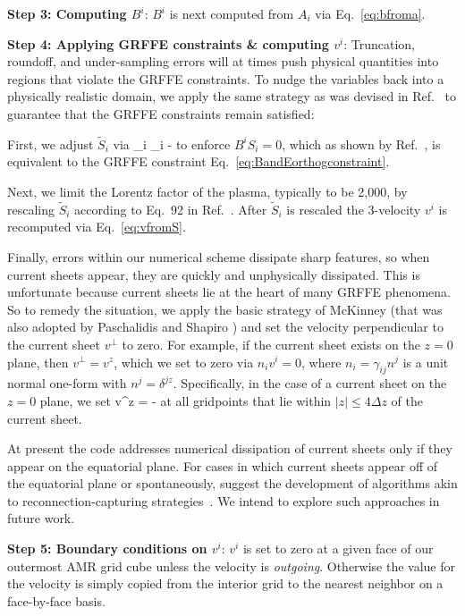 {\bf Step 3: Computing $B^i$}: $B^i$ is next computed from $A_i$ via
Eq.~\ref{eq:bfroma}.

{\bf Step 4: Applying GRFFE constraints \& computing $v^i$}:
Truncation, roundoff, and under-sampling errors will at times push
physical quantities into regions that violate the GRFFE
constraints. To nudge the variables back into a physically realistic
domain, we apply the same strategy as was devised in
Ref.~\cite{Paschalidis:2013} to guarantee that the GRFFE constraints
remain satisfied:

First, we adjust $\tilde{S}_i$ via
\beq
{}_i \to {}_i - 
\eeq
to enforce $B^i S_i=0$, which as shown by Ref.~\cite{Paschalidis:2013}, is
equivalent to the GRFFE constraint Eq.~\ref{eq:BandEorthogconstraint}.

Next, we limit the Lorentz factor of the plasma, typically to be
2,000, by rescaling $\tilde{S}_i$ according to Eq.~92 in
Ref.~\cite{Paschalidis:2013}. After $\tilde{S}_i$ is rescaled the
3-velocity $v^i$ is recomputed via Eq.~\ref{eq:vfromS}.

Finally, errors within our numerical scheme dissipate
sharp features, so when current sheets appear, they are quickly
and unphysically dissipated. This is unfortunate because current
sheets lie at the heart of many GRFFE phenomena. So to remedy the
situation, we apply the basic strategy of McKinney
\cite{McKinney:2006} (that was also adopted by Paschalidis and Shapiro 
\cite{Paschalidis:2013}) and set the velocity perpendicular to the
current sheet $v^\perp$ to zero. For example, if the current sheet
exists on the $z=0$ plane, then $v^\perp=v^z$, which we set to zero
via $n_i v^i=0$, where $n_i=\gamma_{ij} n^j$ is a unit normal one-form
with $n^j=\delta^{jz}$. Specifically, in the case of a current sheet
on the $z=0$ plane, we set
\beq
v^z = -
\eeq
at all gridpoints that lie within $|z|\le 4\Delta z$ of the current
sheet.

At present the code addresses numerical dissipation of current
sheets only if they appear on the equatorial plane. For cases in which
current sheets appear off of the equatorial plane or spontaneously,
\cite{McKinney:2006} suggest the development of algorithms akin to
reconnection-capturing
strategies~\cite{StonePringle2001MNRAS.322..461S}. We intend to
explore such approaches in future work.

{\bf Step 5: Boundary conditions on $v^i$}: $v^i$ is set to zero at a
given face of our outermost AMR grid cube unless the velocity is {\it
  outgoing}. Otherwise the value for the velocity is simply copied
from the interior grid to the nearest neighbor on a face-by-face
basis.


